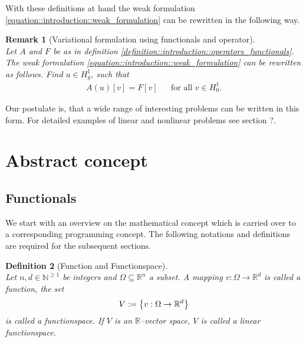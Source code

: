 \documentclass[a4paper,11pt]{article}
\numberwithin{equation}{section}
\newtheorem{definition}{Definition}[section]
\newtheorem{remark}[definition]{Remark}
\newcommand{\theoremNewline}{\hspace{1mm}\\}
\newcommand{\theoremEndLine}{\hspace{1mm}}
\newcommand{\punkt}{\text{.}}
\newcommand{\N}{\mathbb{N}}
\newcommand{\R}{\mathbb{R}}
\begin{document}
    With these definitions at hand the weak formulation \eqref{equation::introduction::weak_formulation} can be
    rewritten in the following way.

    \begin{remark}[Variational formulation using functionals and operator]\theoremNewline
      \label{remakr::introduction::variational_formulation_functionals_operators}
      Let $A$ and $F$ be as in definition \ref{definition::introduction::operators_functionals}. The weak formulation
      \eqref{equation::introduction::weak_formulation} can be rewritten as follows.
      Find ${u \in H^1_g}$, such that
      \begin{align}
        \label{equation::introduction::variational_formulation_functionals_operators}
        A(u)[v] = F[v] &&\text{for all } v\in H^1_0 \punkt
      \end{align}
    \end{remark}

    Our postulate is, that a wide range of interesting problems can be written in this form. For detailed examples of
    linear and nonlinear problems see section ?.

  \section{Abstract concept}
    \label{section::abstract_concept}

    \subsection{Functionals}

      We start with an overview on the mathematical concept which is carried over to a corresponding programming
      concept. The following notations and definitions are required for the subsequent sections.

      \begin{definition}[Function and Functionspace]\theoremNewline
        \label{definition::abstract_concept::function_functionspace}
        Let ${n,d \in \N^{\geq 1}}$ be integers and ${\Omega \subseteq \mathbb{R}^n}$ a subset. A mapping
        ${v : \Omega \rightarrow \R^d}$ is called a \textnormal{function}, the set
        \begin{align}
          V :=
            \big\{
              v : \Omega \rightarrow \R^d
            \big\}
            \notag
        \end{align}
        is called a \textnormal{functionspace}. If $V$ is an $\R$--vector space, $V$ is called a \textnormal{linear functionspace}.
      \end{definition}\theoremEndLine
\end{document}
